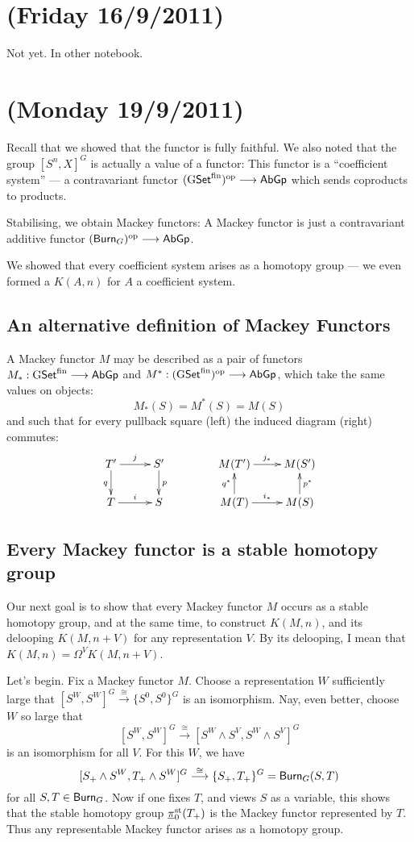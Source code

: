 \documentclass[11pt]{article}
\newcommand{\NewLecture}[3]{\section{#1 {\small(#2/#3/2011)}}}
\begin{document}
\begin{FirstNineLectures}
\NewLecture{}{Friday 16}{9} Not yet. In other notebook.
\NewLecture{}{Monday 19}{9} Recall that
we showed that the functor
is fully faithful. We also noted that the group $[S^n,X]^G$ is actually a value of a functor:
This functor is a ``coefficient system'' --- a contravariant functor $(\operatorname{{G\mathsf{Set}^\textup{fin}}})^{\textup{op}}\longrightarrow\operatorname{{\mathsf{AbGp}}}$ which sends coproducts to products.

Stabilising, we obtain Mackey functors:
A Mackey functor is just a contravariant additive functor $(\operatorname{{\mathsf{Burn}}}_G)^{\textup{op}}\longrightarrow\operatorname{{\mathsf{AbGp}}}$.

We showed that every coefficient system arises as a homotopy group --- we even formed a $K(A,n)$ for $A$ a coefficient system.
\subsection*{An alternative definition of Mackey Functors}
A Mackey functor $M$ may be described as a pair of functors $M_*:\operatorname{{G\mathsf{Set}^\textup{fin}}}\longrightarrow\operatorname{{\mathsf{AbGp}}}$ and $M^*:(\operatorname{{G\mathsf{Set}^\textup{fin}}})^{\textup{op}}\longrightarrow\operatorname{{\mathsf{AbGp}}}$, which take the same values on objects:
\[M_*(S)=M^*(S)=M(S)\]
and such that for every pullback square (left) the induced diagram (right) commutes:
\[\xymatrix@!0@R=12mm@C=1.5cm{
\ar[d]_qT'\ar[r]^j&S'\ar[d]^p\\
T\ar[r]^i&S
}\qquad\qquad\xymatrix@!0@R=12mm@C=2.05cm{
\ar[d];[]^{q^*}M(T')\ar[r]^{j_*}&M(S')\ar[d];[]_{p^*}\\
M(T)\ar[r]^{i_*}&M(S)
}\]
\subsection*{Every Mackey functor is a stable homotopy group}
Our next goal is to show that every Mackey functor $M$ occurs as a stable homotopy group, and at the same time, to construct $K(M,n)$, and its delooping $K(M,n+V)$ for any representation $V$. By its delooping, I mean that $K(M,n)=\Omega^VK(M,n+V)$.

Let's begin. Fix a Mackey functor $M$. Choose a representation $W$ sufficiently large that $[S^W,S^W]^G\overset{\cong}{\to}\{S^0,S^0\}^G$ is an isomorphism. Nay, even better, choose $W$ so large that
\[[S^W,S^W]^G\overset{\cong}{\to} [S^W\wedge S^V,S^W\wedge S^V]^G\]
is an isomorphism for all $V$. For this $W$, we have
\[[S_+\wedge S^W,T_+\wedge S^W]^G\overset{\cong}{\longrightarrow}\{S_+,T_+\}^G=\operatorname{{\mathsf{Burn}}}_G(S,T)\]
for all $S,T\in\operatorname{{\mathsf{Burn}}}_G$. 
Now if one fixes $T$, and views $S$ as a variable, this shows that the stable homotopy group $\underline\pi_0^{\textup{st}} (T_+)$ is the Mackey functor represented by $T$. Thus any representable Mackey functor arises as a homotopy group.


\end{FirstNineLectures}
\end{document}
